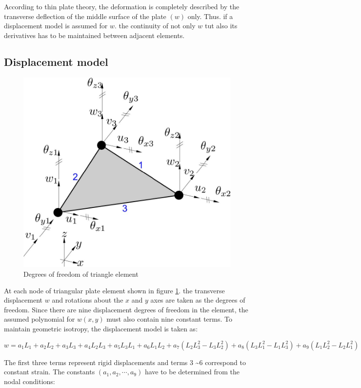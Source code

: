 According to thin plate theory, the deformation is completely described by the transverse deflection of the middle surface of the plate $ (w) $ only. Thus. if a displacement model is assumed for $ w $. the continuity of not only $ w $ tut also its derivatives has to be maintained between adjacent elements.

\subsection{Displacement model}
\begin{figure}[h!]
\centering
\includegraphics[width=0.5\linewidth]{figures/dofs_of_triangle_element}
\caption{Degrees of freedom of triangle element}
\label{fig: Nodal degrees of freedom of a triangular plate in bending}
\end{figure}

At each node of triangular plate element shown in figure \ref{fig: Nodal degrees of freedom of a triangular plate in bending}. the transverse displacement $ w $ and rotations about the $ x $ and $ y $ axes are taken as the degrees of freedom. Since there are nine displacement degrees of freedom in the element, the assumed polynomial for $ w(x,y) $ must also contain nine constant terms. To maintain geometric isotropy, the displacement model is taken as:

\begin{equation}\label{eq: displacement model for plate bending}
w = a_1 L_1 + a_2 L_2 + a_3 L_3 + a_4 L_2 L_3 + a_5 L_3 L_1 + a_6 L_1 L_2 + a_7 (L_2 L_3^2 - L_3 L_2^2) + a_8 (L_3 L_1^2-L_1 L_3^2) + a_9(L_1 L_2^2 - L_2 L_1^2)
\end{equation}

The first three terms represent rigid displacements and terms 3 \textasciitilde 6 correspond to constant strain. The constants $ (a_1, a_2, \cdots, a_9) $ have to be determined from the nodal conditions:

